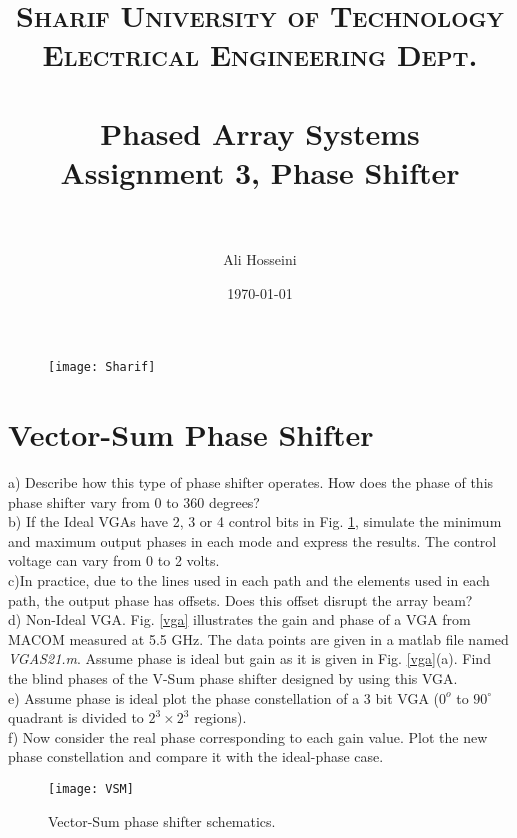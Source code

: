 \documentclass[paper=a4, fontsize=11pt]{scrartcl} %
\title{	
\normalfont \normalsize 
\textsc{Sharif University of Technology\\ Electrical Engineering Dept.} \\ [25pt] %
\horrule{0.5pt} \\[0.4cm] %
\huge Phased Array Systems\\ Assignment 3, Phase Shifter  \\ %
\horrule{2pt} \\[0.5cm] %
}
\author{Ali Hosseini} %
\date{\normalsize\today} %
\numberwithin{equation}{section} %
\numberwithin{figure}{section} %
\numberwithin{table}{section} %
\begin{document}
\maketitle %
\begin{figure}[!t]
\centering
\texttt{[image: Sharif]}
\end{figure}

\section{Vector-Sum Phase Shifter}\label{clear}

a)  Describe how this type of phase shifter operates. How does the phase of this phase shifter vary from 0 to 360 degrees?\\

b) If the Ideal VGAs have 2, 3 or 4 control bits in Fig. \ref{vsum}, simulate the minimum and maximum output phases in each mode and express the results. The control voltage can vary from 0 to 2 volts.\\

c)In practice, due to the lines used in each path and the elements used in each path, the output phase has offsets. Does this offset disrupt the array beam?\\

d) Non-Ideal VGA. Fig. \ref{vga} illustrates the gain and phase of a VGA from MACOM measured at 5.5 GHz. The data points are given in a matlab file named \textit{VGAS21.m}. Assume phase is ideal but gain as it is given in Fig. \ref{vga}(a). Find the blind phases of the V-Sum phase shifter designed by using this VGA. \\

e) Assume phase is ideal plot the phase constellation of a 3 bit VGA ($0^o$ to $90^\circ$ quadrant is divided to $2^3\times 2^3$ regions).\\

f) Now consider the real phase corresponding to each gain value. Plot the new phase constellation and compare it with the ideal-phase case.\\
\begin{figure}[bh]
\centering
\texttt{[image: VSM]}
\caption{Vector-Sum phase shifter schematics.}\label{vsum}
\end{figure}
\end{document}
